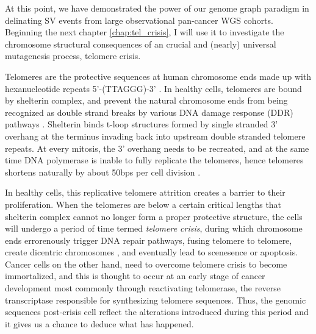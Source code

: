\documentclass[phd,tocprelim]{cornell}
\begin{document}
At this point, we have demonstrated the power of our genome graph paradigm in delinating SV events from large observational pan-cancer WGS cohorts. Beginning the next chapter \ref{chap:tel_crisis}, I will use it to investigate the chromosome structural consequences of an crucial and (nearly) universal mutagenesis process, telomere crisis.

Telomeres are the protective sequences at human chromosome ends made up with hexanucleotide repeats 5'-(TTAGGG)-3' \cite{De_Lange1990-mz}. In healthy cells, telomeres are bound by shelterin complex, and prevent the natural chromosome ends from being recognized as double strand breaks by various DNA damage response (DDR) pathways \cite{De_Lange2005-cn}. Shelterin binds t-loop structures formed by single stranded 3' overhang at the terminus invading back into upstream double stranded telomere repeats. At every mitosis, the 3' overhang needs to be recreated, and at the same time DNA polymerase is inable to fully replicate the telomeres, hence telomeres shortens naturally by about 50bps per cell division \cite{De_Lange2005-cn}. 

In healthy cells, this replicative telomere attrition creates a barrier to their proliferation. When the telomeres are below a certain critical lengths that shelterin complex cannot no longer form a proper protective structure, the cells will undergo a period of time termed \textit{telomere crisis}, during which chromosome ends errorenously trigger DNA repair pathways, fusing telomere to telomere, create dicentric chromosomes \cite{Artandi2000-ab,Maciejowski2017-kx}, and eventually lead to scenesence or apoptosis. Cancer cells on the other hand, need to overcome telomere crisis to become immortalized, and this is thought to occur at an early stage of cancer development \cite{Shay2005-fb} most commonly through reactivating telomerase, the reverse transcriptase responsible for synthesizing telomere sequences. Thus, the genomic sequences post-crisis cell reflect the alterations introduced during this period and it gives us a chance to deduce what has happened.
\end{document}
